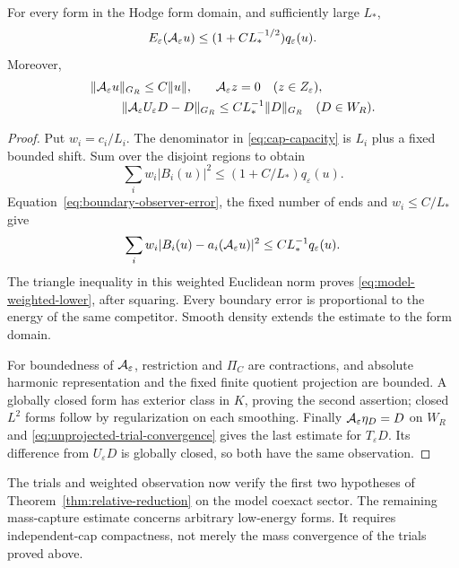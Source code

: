 \begin{proposition}\label{prop:weighted-observer-bound}
For every form in the Hodge form domain, and sufficiently large $L_*$,
\begin{equation}\label{eq:model-weighted-lower}
 E_\varepsilon(\mathcal A_\varepsilon u)
       \le(1+CL_*^{-1/2})q_\varepsilon(u).
\end{equation}
Moreover,
\begin{equation}\label{eq:observer-bounded-closed}
 \begin{aligned}
 \|\mathcal A_\varepsilon u\|_{G_R}\le C\|u\|,\qquad
 &\mathcal A_\varepsilon z=0\quad(z\in Z_\varepsilon),\\
 \|\mathcal A_\varepsilon U_\varepsilon D-D\|_{G_R}
       &\le CL_*^{-1}\|D\|_{G_R}\quad(D\in W_R).
 \end{aligned}
\end{equation}
\end{proposition}
\begin{proof}
Put $w_i=c_i/L_i$. The denominator in \eqref{eq:cap-capacity}
is $L_i$ plus a fixed bounded shift. Sum over the disjoint regions
to obtain
\[
 \sum_iw_i|B_i(u)|^2\le(1+C/L_*)q_\varepsilon(u).
\]
Equation~\eqref{eq:boundary-observer-error}, the fixed number of
ends and $w_i\le C/L_*$ give
\[
 \sum_iw_i|B_i(u)-a_i(\mathcal A_\varepsilon u)|^2
       \le C L_*^{-1}q_\varepsilon(u).
\]
The triangle inequality in this weighted Euclidean norm proves
\eqref{eq:model-weighted-lower}, after squaring. Every boundary
error is proportional to the energy of the same competitor.
Smooth density extends the estimate to the form domain.

For boundedness of $\mathcal A_\varepsilon$, restriction and $\Pi_C$ are
contractions, and absolute harmonic representation and the fixed
finite quotient projection are bounded. A globally closed form has
exterior class in $K$, proving the second assertion; closed $L^2$
forms follow by regularization on each smoothing. Finally
$\mathcal A_\varepsilon\eta_D=D$ on $W_R$ and
\eqref{eq:unprojected-trial-convergence} gives the last estimate
for $T_\varepsilon D$. Its difference from $U_\varepsilon D$ is
globally closed, so both have the same observation.
\end{proof}

The trials and weighted observation now verify the first two hypotheses
of Theorem~\ref{thm:relative-reduction} on the model coexact sector.
The remaining mass-capture estimate concerns arbitrary low-energy forms.
It requires independent-cap compactness, not merely the mass convergence
of the trials proved above.
